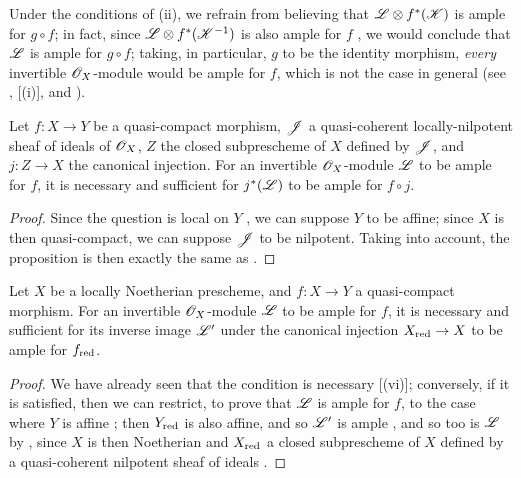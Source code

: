 \begin{remark}[4.6.14]
\label{II.4.6.14}
Under the conditions of (ii), we refrain from believing that $\mathscr{L}\otimes f^*(\mathscr{K})$ is ample for $g\circ f$;
in fact, since $\mathscr{L}\otimes f^*(\mathscr{K}^{-1})$ is also ample for $f$ , we would conclude that $\mathscr{L}$ is ample for $g\circ f$;
taking, in particular, $g$ to be the identity morphism, \emph{every} invertible $\mathscr{O}_X$-module would be ample for $f$, which is not the case in general (see , [(i)], and ).
\end{remark}

\begin{proposition}[4.6.15]
\label{II.4.6.15}
Let $f:X\to Y$ be a quasi-compact morphism, $\mathscr{J}$ a quasi-coherent locally-nilpotent sheaf of ideals of $\mathscr{O}_X$, $Z$ the closed subprescheme of $X$ defined by $\mathscr{J}$, and $j:Z\to X$ the canonical injection.
For an invertible $\mathscr{O}_X$-module $\mathscr{L}$ to be ample for $f$, it is necessary and sufficient for $j^*(\mathscr{L})$ to be ample for $f\circ j$.
\end{proposition}

\begin{proof}
Since the question is local on $Y$ , we can suppose $Y$ to be affine;
since $X$ is then quasi-compact, we can suppose $\mathscr{J}$ to be nilpotent.
Taking  into account, the proposition is then exactly the same as .
\end{proof}

\begin{corollary}[4.6.16]
\label{II.4.6.16}
Let $X$ be a locally Noetherian prescheme, and $f:X\to Y$ a quasi-compact morphism.
For an invertible $\mathscr{O}_X$-module $\mathscr{L}$ to be ample for $f$, it is necessary and sufficient for its inverse image $\mathscr{L}'$ under the canonical injection $X_\red\to X$ to be ample for $f_{\mathrm{red}}$.
\end{corollary}

\begin{proof}
We have already seen that the condition is necessary [(vi)];
conversely, if it is satisfied, then we can restrict, to prove that $\mathscr{L}$ is ample for $f$, to the case where $Y$ is affine ;
then $Y_{\mathrm{red}}$ is also affine, and so $\mathscr{L}'$ is ample , and so too is $\mathscr{L}$ by , since $X$ is then Noetherian and $X_{\mathrm{red}}$ a closed subprescheme of $X$ defined by a quasi-coherent nilpotent sheaf of ideals .
\end{proof}

